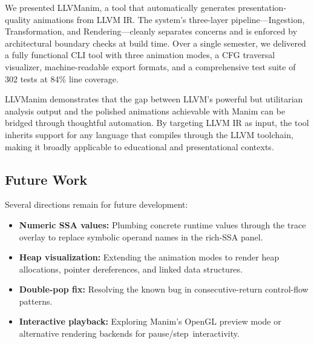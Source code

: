 We presented LLVManim, a tool that automatically generates presentation-quality animations from LLVM IR. The system's three-layer pipeline---Ingestion, Transformation, and Rendering---cleanly separates concerns and is enforced by architectural boundary checks at build time. Over a single semester, we delivered a fully functional CLI tool with three animation modes, a CFG traversal visualizer, machine-readable export formats, and a comprehensive test suite of 302 tests at 84\% line coverage.

LLVManim demonstrates that the gap between LLVM's powerful but utilitarian analysis output and the polished animations achievable with Manim can be bridged through thoughtful automation. By targeting LLVM IR as input, the tool inherits support for any language that compiles through the LLVM toolchain, making it broadly applicable to educational and presentational contexts.


\subsection*{\centering Future Work}
Several directions remain for future development:
\begin{itemize}
    \item \textbf{Numeric SSA values:} Plumbing concrete runtime values through the trace overlay to replace symbolic operand names in the rich-SSA panel.
    \item \textbf{Heap visualization:} Extending the animation modes to render heap allocations, pointer dereferences, and linked data structures.
    \item \textbf{Double-pop fix:} Resolving the known bug in consecutive-return control-flow patterns.
    \item \textbf{Interactive playback:} Exploring Manim's OpenGL preview mode or alternative rendering backends for pause/step~interactivity.
\end{itemize}
